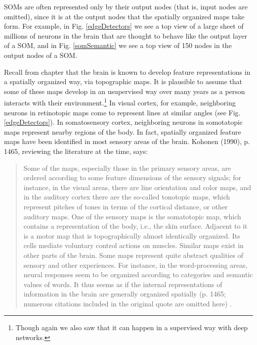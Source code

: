 SOMs are often represented only by their output nodes (that is, input nodes are omitted), since it is at the output nodes that the spatially organized maps take form. For example, in Fig. \ref{edgeDetectors} we see a top view of a large sheet of millions of neurons in the brain that are thought to behave like the output layer of a SOM, and in Fig. \ref{somSemantic} we see a top view of 150 nodes in the output nodes of a SOM.

Recall from chapter  that the brain is known to develop feature representations in a spatially organized way, via topographic maps. It is plausible to assume that some of these maps develop in an usupervised way over many years as a person interacts with their environment.\footnote{Though again we also saw that it can happen in a supervised way with deep networks.} In visual cortex, for example, neighboring neurons in retinotopic maps come to represent lines at similar angles  (see Fig. \ref{edgeDetectors}). In somatosensory cortex, neighboring neurons in somotatopic maps represent nearby regions of the body. In fact, spatially organized feature maps have been identified in most sensory areas of the brain. Kohonen (1990), p. 1465, reviewing the literature at the time, says:

\begin{quotation}
Some of the maps, especially those in the primary sensory areas, are ordered according to some feature dimensions of the sensory signals; for instance, in the visual areas, there are line orientation and color maps, and in the auditory cortex there are the so-called tonotopic maps, which represent pitches of tones in terms of the cortical distance, or other auditory maps. One of the sensory maps is the somatotopic map, which contains a representation of the body, i.e., the skin surface. Adjacent to it is a motor map that is topographically almost identically organized. Its cells mediate voluntary control actions on muscles. Similar maps exist in other parts of the brain. Some maps represent quite abstract qualities of sensory and other experiences. For instance, in the word-processing areas, neural responses seem to be organized according to categories and semantic values of words. It thus seems as if the internal representations of information in the brain are generally organized spatially (p. 1465; numerous citations included in the original quote are omitted here) \cite{kohonen1990self}.
\end{quotation}

